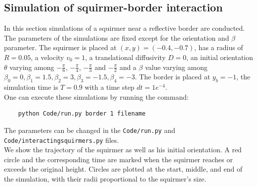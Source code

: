 \documentclass{article}
\begin{document}
\subsection{Simulation of squirmer-border interaction}
In this section simulations of a squirmer near a reflective border are conducted. The parameters of the simulations are fixed
except for the orientation and $\beta$ parameter. The squirmer is placed at $(x,y) = (-0.4,-0.7)$, has a radius of $R=0.05$,
a velocity $v_0=1$, a translational diffusivity $D=0$, an initial orientation $\theta$ varying among $-\frac{\pi}{6}$, $-\frac{\pi}{4}$, $-\frac{\pi}{3}$
and $-\frac{\pi}{2}$ and a $\beta$ value varying among $\beta_0 = 0, \beta_1 = 1.5, \beta_2 = 3, \beta_3 = -1.5, \beta_4 = -3$.
The border is placed at $y_b = -1$, the simulation time is $T = 0.9$ with a time step $dt = 1e^{-4}$.\\
One can execute these simulations by running the command:
 \begin{verbatim}
    python Code/run.py border 1 filename
 \end{verbatim}
 The parameters can be changed in the \texttt{Code/run.py} and \\
 \texttt{Code/interactingsquirmers.py} files.\\
 We show the trajectory of the squirmer as well as his initial orientation. A red circle and the corresponding time are marked when the squirmer
 reaches or exceeds the original height. Circles are plotted at the start, 
 middle, and end of the simulation, with their radii proportional to the squirmer's size.
\end{document}
